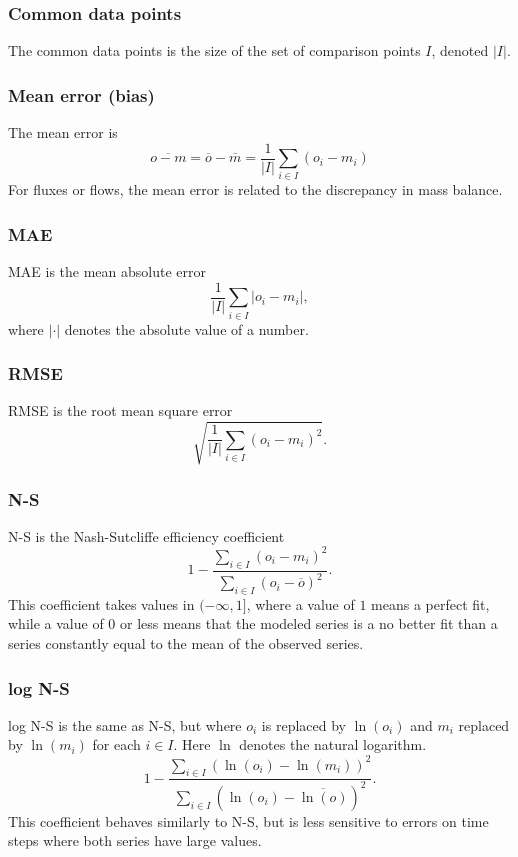 \documentclass[11pt]{article}
\theoremstyle{definition}
\begin{document}
\subsubsection{Common data points}
The common data points is the size of the set of comparison points $I$, denoted $|I|$.

\subsubsection{Mean error (bias)}
The mean error is
\[
\overline{o - m} = \overline{o} -\overline{m} =\frac{1}{|I|} \sum_{i\in I} (o_i - m_i)
\]
For fluxes or flows, the mean error is related to the discrepancy in mass balance.

\subsubsection{MAE}
MAE is the mean absolute error
\[
\frac{1}{|I|}\sum_{i\in I}|o_i - m_i|,
\]
where $|\cdot|$ denotes the absolute value of a number.

\subsubsection{RMSE}
RMSE is the root mean square error
\[
\sqrt{\frac{1}{|I|}\sum_{i\in I}(o_i-m_i)^2}.
\]

\subsubsection{N-S}
N-S is the Nash-Sutcliffe efficiency coefficient \cite{nashsutcliffe70}
\[
1 - \frac{\sum_{i\in I}(o_i - m_i)^2}{\sum_{i\in I}(o_i-\overline{o})^2}.
\]
This coefficient takes values in $(-\infty, 1]$, where a value of $1$ means a perfect fit, while a value of $0$ or less means that the modeled series is a no better fit than a series constantly equal to the mean of the observed series.

\subsubsection{log N-S}
log N-S is the same as N-S, but where $o_i$ is replaced by $\ln(o_i)$ and $m_i$ replaced by $\ln(m_i)$ for each $i\in I$. Here $\ln$ denotes the natural logarithm.
\[
1 - \frac{\sum_{i\in I}(\ln(o_i) - \ln(m_i))^2}{\sum_{i\in I}(\ln(o_i)-\overline{\ln(o)})^2}.
\]
This coefficient behaves similarly to N-S, but is less sensitive to errors on time steps where both series have large values.
\end{document}
